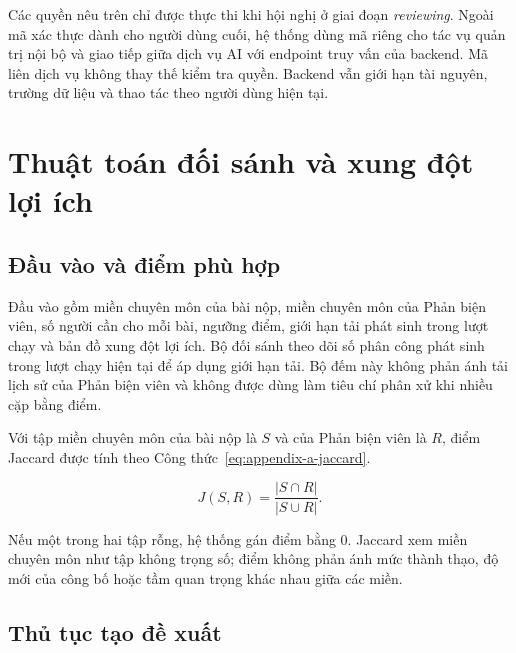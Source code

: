 Các quyền nêu trên chỉ được thực thi khi hội nghị ở giai đoạn \textit{reviewing}. Ngoài mã xác thực dành cho người dùng cuối, hệ thống dùng mã riêng cho tác vụ quản trị nội bộ và giao tiếp giữa dịch vụ AI với endpoint truy vấn của backend. Mã liên dịch vụ không thay thế kiểm tra quyền. Backend vẫn giới hạn tài nguyên, trường dữ liệu và thao tác theo người dùng hiện tại.

\section{Thuật toán đối sánh và xung đột lợi ích}
\label{sec:appendix-a-algorithms}

\subsection{Đầu vào và điểm phù hợp}

Đầu vào gồm miền chuyên môn của bài nộp, miền chuyên môn của Phản biện viên, số người cần cho mỗi bài, ngưỡng điểm, giới hạn tải phát sinh trong lượt chạy và bản đồ xung đột lợi ích. Bộ đối sánh theo dõi số phân công phát sinh trong lượt chạy hiện tại để áp dụng giới hạn tải. Bộ đếm này không phản ánh tải lịch sử của Phản biện viên và không được dùng làm tiêu chí phân xử khi nhiều cặp bằng điểm.

Với tập miền chuyên môn của bài nộp là \(S\) và của Phản biện viên là \(R\), điểm Jaccard được tính theo Công thức~\ref{eq:appendix-a-jaccard}.

\begin{equation}
J(S,R)=\frac{|S\cap R|}{|S\cup R|}.
\label{eq:appendix-a-jaccard}
\end{equation}

Nếu một trong hai tập rỗng, hệ thống gán điểm bằng \(0\). Jaccard xem miền chuyên môn như tập không trọng số; điểm không phản ánh mức thành thạo, độ mới của công bố hoặc tầm quan trọng khác nhau giữa các miền.

\subsection{Thủ tục tạo đề xuất}

